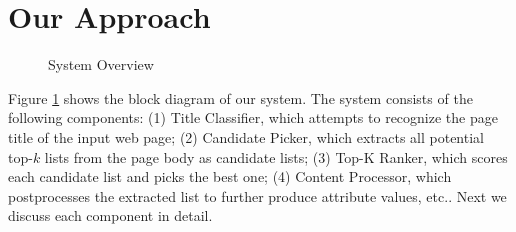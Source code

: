 \section{Our Approach}
\label{sec:algo}

\begin{figure}[th]
\centering
{}
\caption{System Overview}
\label{fig:sys}
\end{figure}

Figure \ref{fig:sys} shows the block diagram of our system.  The
system consists of the following components: (1) Title Classifier,
which attempts to recognize the page title of the input web page; (2)
Candidate Picker, which extracts all potential top-$k$ lists
from the page body as candidate lists;  (3) Top-K Ranker, which
scores each candidate list and picks the best one;  (4) Content
Processor, which postprocesses the extracted list to further produce attribute
values, etc..
Next we discuss each component in detail.


%





%

